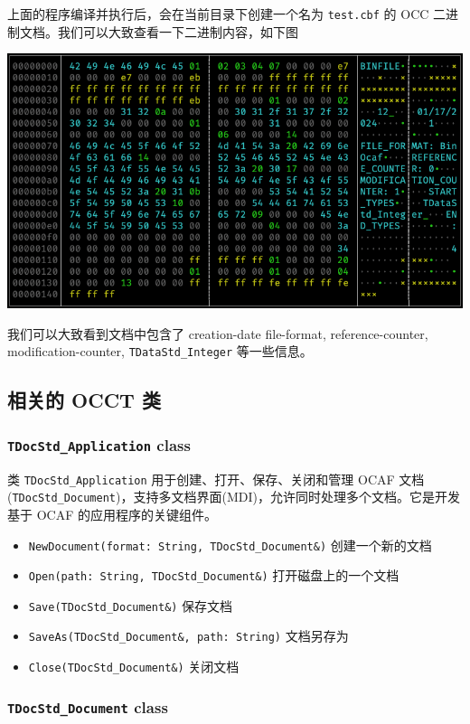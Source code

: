 \documentclass[11pt]{article}
\begin{document}
上面的程序编译并执行后，会在当前目录下创建一个名为 \texttt{test.cbf} 的 OCC 二进制文档。我们可以大致查看一下二进制内容，如下图

\begin{center}
\includegraphics[width=.9\linewidth]{./img/binocaf-binary-content.png}
\end{center}

我们可以大致看到文档中包含了 creation-date file-format, reference-counter, modification-counter, \texttt{TDataStd\_Integer} 等一些信息。
\subsection{相关的 OCCT 类}
\label{sec:org335a9f0}

\subsubsection{\texttt{TDocStd\_Application} class}
\label{sec:orga165cec}

类 \texttt{TDocStd\_Application} 用于创建、打开、保存、关闭和管理 OCAF 文档(\texttt{TDocStd\_Document})，支持多文档界面(MDI)，允许同时处理多个文档。它是开发基于 OCAF 的应用程序的关键组件。

\begin{itemize}
\item \texttt{NewDocument(format: String, TDocStd\_Document\&)} 创建一个新的文档
\item \texttt{Open(path: String, TDocStd\_Document\&)} 打开磁盘上的一个文档
\item \texttt{Save(TDocStd\_Document\&)} 保存文档
\item \texttt{SaveAs(TDocStd\_Document\&, path: String)} 文档另存为
\item \texttt{Close(TDocStd\_Document\&)} 关闭文档
\end{itemize}
\subsubsection{\texttt{TDocStd\_Document} class}
\label{sec:orgd48ac12}
\end{document}
